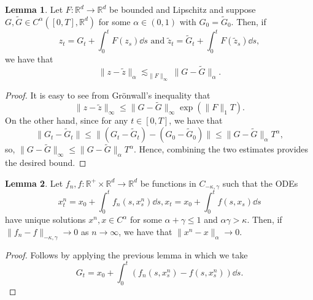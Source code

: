\documentclass[]{article}
\theoremstyle{definition}
\theoremstyle{definition}
\newtheorem{lemma}{Lemma}
\begin{document}
\begin{lemma}
  Let \(F : \mathbb{R}^d \to \mathbb{R}^d\) be bounded and Lipschitz and suppose 
  \(G, \tilde G \in C^\alpha([0, T], \mathbb{R}^d)\) for some \(\alpha \in (0, 1)\) with \(G_0 = \tilde G_0\). 
  Then, if 
  \[z_t = G_t + \int_0^t F(z_s) \dd s \text{ and } \tilde z_t = \tilde G_t + \int_0^t F(\tilde z_s) \dd s,\]
  we have that 
  \[\|z - \tilde z\|_\alpha \lesssim_{\|F\|_\infty}\|G - \tilde G\|_\alpha.\]
\end{lemma}
\begin{proof}
  It is easy to see from Gr\"onwall's inequality that 
  \[\|z - \tilde z\|_\infty \le \|G - \tilde G\|_\infty \exp(\|F\|_1 T).\]
  On the other hand, since for any \(t \in [0, T]\), we have that
  \[\|G_t - \tilde G_t\| \le \|(G_t - \tilde G_t) - (G_0 - \tilde G_0)\| \le \|G - \tilde G\|_\alpha T^\alpha,\]
  so, \(\|G - \tilde G\|_\infty \le \|G - \tilde G\|_\alpha T^\alpha\). Hence, combining the two estimates provides 
  the desired bound.
\end{proof}

\begin{lemma}
  Let \(f_n, f : \mathbb{R}^+ \times \mathbb{R}^d \to \mathbb{R}^d\) be functions in \(C_{-\kappa, \gamma}\)
  such that the ODEs 
  \[x^n_t = x_0 + \int_0^t f_n(s, x_s^n) \dd s, x_t = x_0 + \int_0^t f(s, x_s) \dd s\]
  have unique solutions \(x^n, x \in C^\alpha\) for some \(\alpha + \gamma \le 1\) and \(\alpha \gamma > \kappa\).
  Then, if \(\|f_n - f\|_{-\kappa, \gamma} \to 0\) as \(n \to \infty\), we have that 
  \(\|x^n - x\|_\alpha \to 0\).
\end{lemma}
\begin{proof}
  Follows by applying the previous lemma in which we take 
  \[G_t = x_0 + \int_0^t (f_n(s, x_s^n) - f(s, x_s^n)) \dd s.\]
\end{proof}
\end{document}
